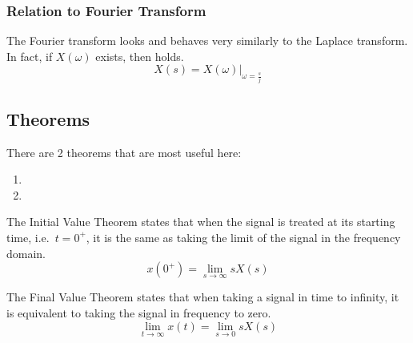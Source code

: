 \subsubsection{Relation to Fourier Transform}\label{subsubsec:Fourier_Transform_Relation}
The Fourier transform looks and behaves very similarly to the Laplace transform.
In fact, if $X(\omega)$ exists, then  holds.
\begin{equation}\label{eq:Fourier_Laplace_Transform_Relation}
  X(s) = X(\omega) \vert_{\omega = \frac{s}{j}}
\end{equation}

\subsection{Theorems}\label{subsec:Laplace_Theorems}
There are 2 theorems that are most useful here:
\begin{enumerate}[noitemsep]
\item {}
\item {}
\end{enumerate}

\begin{theorem}\label{thm:Laplace_Initial_Value_Theorem}
  The Initial Value Theorem states that when the signal is treated at its starting time, i.e.\ $t=0^{+}$, it is the same as taking the limit of the signal in the frequency domain.
  \begin{equation*}
    x(0^{+}) = \lim\limits_{s \rightarrow \infty} s X(s)
  \end{equation*}
\end{theorem}

\begin{theorem}\label{thm:Laplace_Final_Value_Theorem}
  The Final Value Theorem states that when taking a signal in time to infinity, it is equivalent to taking the signal in frequency to zero.
  \begin{equation*}
    \lim\limits_{t \rightarrow \infty} x(t) = \lim\limits_{s \rightarrow 0} s X(s)
  \end{equation*}
\end{theorem}

